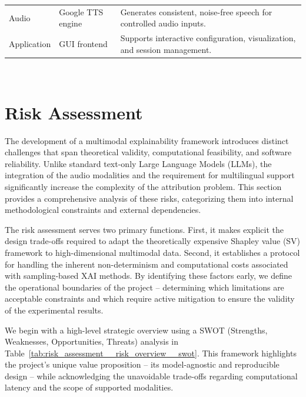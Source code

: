 \begin{appendices}
\begin{table}[htbp]
\begin{tabular}{m{1.8cm} m{4cm} m{8cm}}
    Audio       & Google TTS engine                     & Generates consistent, noise-free speech for controlled audio inputs. \\

    Application & GUI frontend                   & Supports interactive configuration, visualization, and session management. \\

    \bottomrule

    \end{tabular}
    \label{tab:requirements_inventory}
    \end{table}

    \newpage \ \null\thispagestyle{empty}\newpage
    \chapter{Risk Assessment}
    \label{app:risk_assessment}

    The development of a multimodal explainability framework introduces distinct challenges that span theoretical validity, computational feasibility, and software reliability. Unlike standard text-only Large Language Models (LLMs), the integration of the audio modalities and the requirement for multilingual support significantly increase the complexity of the attribution problem. This section provides a comprehensive analysis of these risks, categorizing them into internal methodological constraints and external dependencies.

    The risk assessment serves two primary functions. First, it makes explicit the design trade-offs required to adapt the theoretically expensive Shapley value (SV) framework to high-dimensional multimodal data. Second, it establishes a protocol for handling the inherent non-determinism and computational costs associated with sampling-based XAI methods. By identifying these factors early, we define the operational boundaries of the project -- determining which limitations are acceptable constraints and which require active mitigation to ensure the validity of the experimental results.

    We begin with a high-level strategic overview using a SWOT (Strengths, Weaknesses, Opportunities, Threats) analysis in Table~\ref{tab:risk_assessment__risk_overview__swot}. This framework highlights the project's unique value proposition -- its model-agnostic and reproducible design -- while acknowledging the unavoidable trade-offs regarding computational latency and the scope of supported modalities.


\end{appendices}
